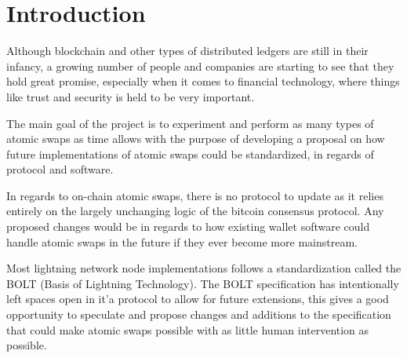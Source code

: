 
\chapter{Introduction}
Although blockchain and other types of distributed ledgers are still in their
infancy, a growing number of people and companies are starting to see that they
hold great promise, especially when it comes to financial technology, where
things like trust and security is held to be very important.







The main goal of the project is to experiment and perform as many types of atomic swaps as time allows with the purpose of developing a proposal on how future implementations of atomic swaps could be standardized, in regards of protocol and software.

In regards to on-chain atomic swaps, there is no protocol to update as it relies entirely on the largely unchanging logic of the bitcoin consensus protocol. Any proposed changes would be in regards to how existing wallet software could handle atomic swaps in the future if they ever become more mainstream.

Most lightning network node implementations follows a standardization called the BOLT (Basis of Lightning Technology). The BOLT specification has intentionally left spaces open in it'a protocol to allow for future extensions, this gives a good opportunity to speculate and propose changes and additions to the specification that could make atomic swaps possible with as little human intervention as possible.